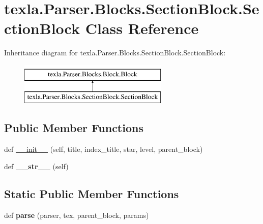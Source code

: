 \hypertarget{classtexla_1_1Parser_1_1Blocks_1_1SectionBlock_1_1SectionBlock}{}\section{texla.\+Parser.\+Blocks.\+Section\+Block.\+Section\+Block Class Reference}
\label{classtexla_1_1Parser_1_1Blocks_1_1SectionBlock_1_1SectionBlock}
Inheritance diagram for texla.\+Parser.\+Blocks.\+Section\+Block.\+Section\+Block\+:\begin{figure}[H]
\begin{center}
\leavevmode
\includegraphics[height=2.000000cm]{classtexla_1_1Parser_1_1Blocks_1_1SectionBlock_1_1SectionBlock}
\end{center}
\end{figure}
\subsection*{Public Member Functions}
\begin{DoxyCompactItemize}
\item 
def \hyperlink{classtexla_1_1Parser_1_1Blocks_1_1SectionBlock_1_1SectionBlock_aaaffff6b091aa366f66ecfae3ec7b909}{\+\_\+\+\_\+init\+\_\+\+\_\+} (self, title, index\+\_\+title, star, level, parent\+\_\+block)
\item 
\hypertarget{classtexla_1_1Parser_1_1Blocks_1_1SectionBlock_1_1SectionBlock_aadad22f461c2e48cc651f6b78bd98b9b}{}\label{classtexla_1_1Parser_1_1Blocks_1_1SectionBlock_1_1SectionBlock_aadad22f461c2e48cc651f6b78bd98b9b} 
def {\bfseries \+\_\+\+\_\+str\+\_\+\+\_\+} (self)
\end{DoxyCompactItemize}
\subsection*{Static Public Member Functions}
\begin{DoxyCompactItemize}
\item 
\hypertarget{classtexla_1_1Parser_1_1Blocks_1_1SectionBlock_1_1SectionBlock_af23ad266eb0f4899bc88a5b93d583cb1}{}\label{classtexla_1_1Parser_1_1Blocks_1_1SectionBlock_1_1SectionBlock_af23ad266eb0f4899bc88a5b93d583cb1} 
def {\bfseries parse} (parser, tex, parent\+\_\+block, params)
\end{DoxyCompactItemize}
